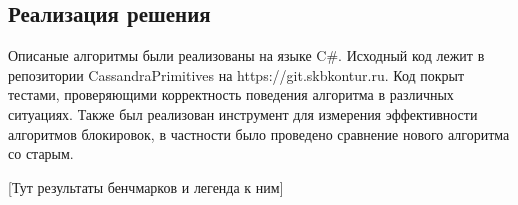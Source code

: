 \subsection{Реализация решения}

Описаные алгоритмы были реализованы на языке C\#. Исходный код лежит в репозитории CassandraPrimitives на https://git.skbkontur.ru. Код покрыт тестами, проверяющими корректность поведения алгоритма в различных ситуациях. Также был реализован инструмент для измерения эффективности алгоритмов блокировок, в частности было проведено сравнение нового алгоритма со старым.

[Тут результаты бенчмарков и легенда к ним]